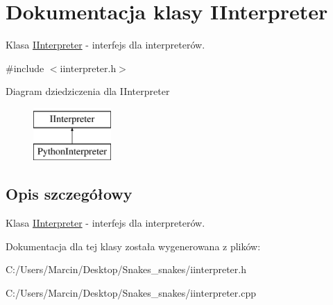 \hypertarget{class_i_interpreter}{\section{Dokumentacja klasy I\+Interpreter}
\label{class_i_interpreter}
}


Klasa \hyperlink{class_i_interpreter}{I\+Interpreter} -\/ interfejs dla interpreterów.  




{\ttfamily \#include $<$iinterpreter.\+h$>$}

Diagram dziedziczenia dla I\+Interpreter\begin{figure}[H]
\begin{center}
\leavevmode
\includegraphics[height=2.000000cm]{class_i_interpreter}
\end{center}
\end{figure}


\subsection{Opis szczegółowy}
Klasa \hyperlink{class_i_interpreter}{I\+Interpreter} -\/ interfejs dla interpreterów. 

Dokumentacja dla tej klasy została wygenerowana z plików\+:\begin{DoxyCompactItemize}
\item 
C\+:/\+Users/\+Marcin/\+Desktop/\+Snakes\+\_\+snakes/iinterpreter.\+h\item 
C\+:/\+Users/\+Marcin/\+Desktop/\+Snakes\+\_\+snakes/iinterpreter.\+cpp\end{DoxyCompactItemize}
